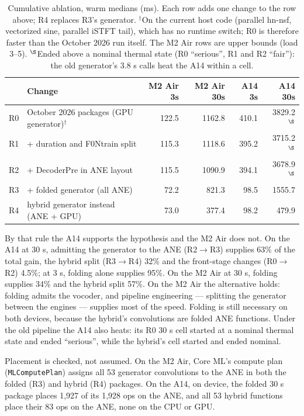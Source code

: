 \documentclass[11pt]{article}
\newcommand{\code}[1]{\texttt{#1}}
\begin{document}
\begin{table}[h]
\centering
\small
\caption{Cumulative ablation, warm medians (ms). Each row adds one change to the row above; R4 replaces R3's generator. $^\dagger$On the current host code (parallel hn-nsf, vectorized sine, parallel iSTFT tail), which has no runtime switch; R0 is therefore faster than the October 2026 run itself. The M2 Air rows are upper bounds (load 3--5). $^\S$Ended above a nominal thermal state (R0 ``serious'', R1 and R2 ``fair''): the old generator's 3.8 s calls heat the A14 within a cell.}
\label{tab:cs1-ablation}
\begin{tabular}{llrrrr}
\toprule
 & Change & M2 Air 3s & M2 Air 30s & A14 3s & A14 30s \\
\midrule
R0 & October 2026 packages (GPU generator)$^\dagger$ & 122.5 & 1162.8 & 410.1 & 3829.2$^\S$ \\
R1 & + duration and F0Ntrain split & 115.3 & 1118.6 & 395.2 & 3715.2$^\S$ \\
R2 & + DecoderPre in ANE layout & 115.5 & 1090.9 & 394.1 & 3678.9$^\S$ \\
R3 & + folded generator (all ANE) & 72.2 & 821.3 & 98.5 & 1555.7 \\
R4 & hybrid generator instead (ANE + GPU) & 73.0 & 377.4 & 98.2 & 479.9 \\
\bottomrule
\end{tabular}
\end{table}

By that rule the A14 supports the hypothesis and the M2 Air does not. On the A14 at 30 s, admitting the generator to the ANE (R2$\rightarrow$R3) supplies 63\% of the total gain, the hybrid split (R3$\rightarrow$R4) 32\% and the front-stage changes (R0$\rightarrow$R2) 4.5\%; at 3 s, folding alone supplies 95\%. On the M2 Air at 30 s, folding supplies 34\% and the hybrid split 57\%. On the M2 Air the alternative holds: folding admits the vocoder, and pipeline engineering --- splitting the generator between the engines --- supplies most of the speed. Folding is still necessary on both devices, because the hybrid's convolutions are folded ANE functions. Under the old pipeline the A14 also heats: its R0 30 s cell started at a nominal thermal state and ended ``serious'', while the hybrid's cell started and ended nominal.

Placement is checked, not assumed. On the M2 Air, Core ML's compute plan (\code{MLComputePlan}) assigns all 53 generator convolutions to the ANE in both the folded (R3) and hybrid (R4) packages. On the A14, on device, the folded 30 s package places 1,927 of its 1,928 ops on the ANE, and all 53 hybrid functions place their 83 ops on the ANE, none on the CPU or GPU.
\end{document}
